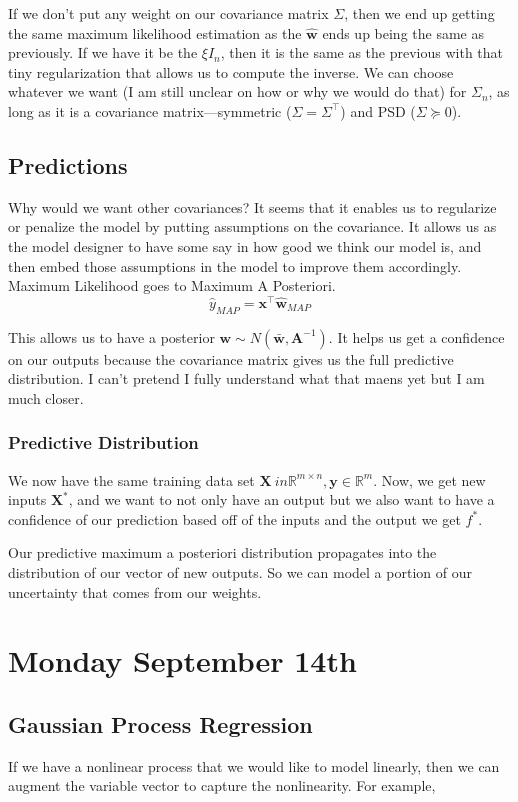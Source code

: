 \documentclass[11pt]{article}
\begin{document}
If we don't put any weight on our covariance matrix $\Sigma$, then we end up getting the same maximum likelihood estimation as the $\hat{\mathbf{w}}$ ends up being the same as previously.
If we have it be the $\xi I_n$, then it is the same as the previous with that tiny regularization that allows us to compute the inverse.
We can choose whatever we want (I am still unclear on how or why we would do that) for $\Sigma_n$, as long as it is a covariance matrix—symmetric ($\Sigma = \Sigma^\top$) and PSD ($\Sigma \succeq 0$).

\subsection{Predictions}
Why would we want other covariances?
It seems that it enables us to regularize or penalize the model by putting assumptions on the covariance.
It allows us as the model designer to have some say in how good we think our model is, and then embed those assumptions in the model to improve them accordingly.
Maximum Likelihood goes to Maximum A Posteriori.
\begin{equation}
  \hat{y}_{MAP} = \textbf{x}^\top \hat{\mathbf{w}}_{MAP}
\end{equation}

This allows us to have a posterior $\textbf{w}\sim N(\bar{\textbf{w}}, \textbf{A}^{-1})$.
It helps us get a confidence on our outputs because the covariance matrix gives us the full predictive distribution.
I can't pretend I fully understand what that maens yet but I am much closer.
\subsubsection{Predictive Distribution}
We now have the same training data set $\textbf{X} \ in \mathbb{R}^{m \times n}, \textbf{y} \in \mathbb{R}^m$.
Now, we get new inputs $\textbf{X}^*$, and we want to not only have an output but we also want to have a confidence of our prediction based off of the inputs and the output we get $f^*$.

Our predictive maximum a posteriori distribution propagates into the distribution of our vector of new outputs.
So we can model a portion of our uncertainty that comes from our weights.

\section{Monday September 14th}
\subsection{Gaussian Process Regression}
If we have a nonlinear process that we would like to model linearly,
then we can augment the variable vector to capture the nonlinearity.
For example,
\end{document}
